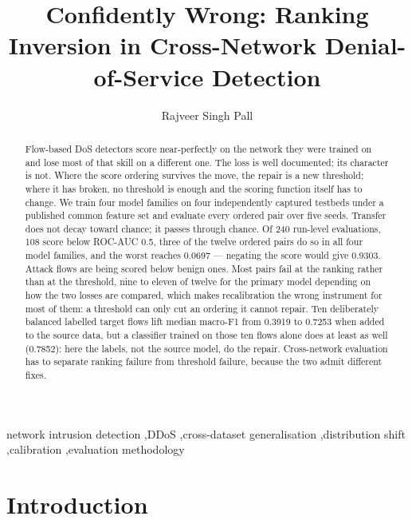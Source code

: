 \documentclass[preprint,12pt,nopreprintline]{elsarticle}
\begin{document}
\begin{frontmatter}
\title{Confidently Wrong: Ranking Inversion in Cross-Network Denial-of-Service Detection}
\author{Rajveer Singh Pall}

\begin{abstract}
Flow-based DoS detectors score near-perfectly on the network they were trained on and lose most of that skill on a different one. The loss is well documented; its character is not. Where the score ordering survives the move, the repair is a new threshold; where it has broken, no threshold is enough and the scoring function itself has to change. We train four model families on four independently captured testbeds under a published common feature set and evaluate every ordered pair over five seeds. Transfer does not decay toward chance; it passes through chance. Of 240 run-level evaluations, 108 score below ROC-AUC 0.5, three of the twelve ordered pairs do so in all four model families, and the worst reaches 0.0697 --- negating the score would give 0.9303. Attack flows are being scored below benign ones. Most pairs fail at the ranking rather than at the threshold, nine to eleven of twelve for the primary model depending on how the two losses are compared, which makes recalibration the wrong instrument for most of them: a threshold can only cut an ordering it cannot repair. Ten deliberately balanced labelled target flows lift median macro-F1 from 0.3919 to 0.7253 when added to the source data, but a classifier trained on those ten flows alone does at least as well (0.7852): here the labels, not the source model, do the repair. Cross-network evaluation has to separate ranking failure from threshold failure, because the two admit different fixes.
\end{abstract}

\begin{keyword}
network intrusion detection \sep DDoS \sep cross-dataset generalisation \sep distribution shift \sep calibration \sep evaluation methodology
\end{keyword}
\end{frontmatter}



\section{Introduction}
\end{document}
